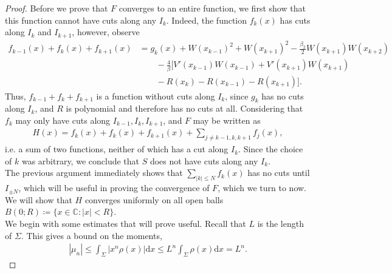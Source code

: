 \documentclass[10pt]{article}
\newcommand{\cc}{\mathbb{C}}
\newcommand{\dif}{\mathrm{d}}
\theoremstyle{plain}
\theoremstyle{definition}
\theoremstyle{plain}
\begin{document}
\begin{proof}
	Before we prove that $F$ converges to an entire function, we first show that this function cannot have cuts along any $I_k$. Indeed, the function $f_k(x)$ has cuts along $I_k$ and $I_{k+1}$, however, observe
	\begin{align*}
		f_{k-1}(x)+f_k(x)+f_{k+1}(x) &=  g_k(x) + W(x_{k-1})^2 + W(x_{k+1})^2 -\frac{\beta_2}{2}W(x_{k+1})W(x_{k+2}) \\
		&\qquad - \frac{4}{\beta}[ V'(x_{k-1})W(x_{k-1})+V'(x_{k+1})W(x_{k+1})\\
		&\qquad - R(x_k)-R(x_{k-1})-R(x_{k+1}) ].
	\end{align*}
	Thus, $f_{k-1}+f_k + f_{k+1}$ is a function without cuts along $I_k$, since $g_k$ has no cuts along $I_k$, and $R$ is polynomial and therefore has no cuts at all. Considering that $f_k$ may only have cuts along $I_{k-1},I_{k},I_{k+1}$, and $F$ may be written as 
	\begin{align*}
		H(x) = f_{k}(x)+f_k(x)+f_{k+1}(x) + \sum_{j\neq k-1,k,k+1} f_j(x),
	\end{align*}
	i.e. a sum of two functions, neither of which has a cut along $I_k$. Since the choice of $k$ was arbitrary, we conclude that $S$ does not have cuts along any $I_k$. \\
	
	
	The previous argument immediately shows that $\sum_{|k|\leq N} f_k(x)$ has no cuts until $I_{\pm N}$, which will be useful in proving the convergence of $F$, which we turn to now. We will show that $H$ converges uniformly on all open balls $B(0;R) \coloneqq \{ x\in \cc : |x|<R \}$. \\
	
	We begin with some estimates that will prove useful. Recall that $L$ is the length of $\Sigma$. This gives a bound on the moments,
	\begin{align*}
		|\mu_n| \leq  \int_\Sigma \bigg| x^n \rho(x)\bigg| \dif x \leq L^n \int_\Sigma \rho(x)\dif x = L^n.
	\end{align*}
	

\end{proof}
\end{document}
